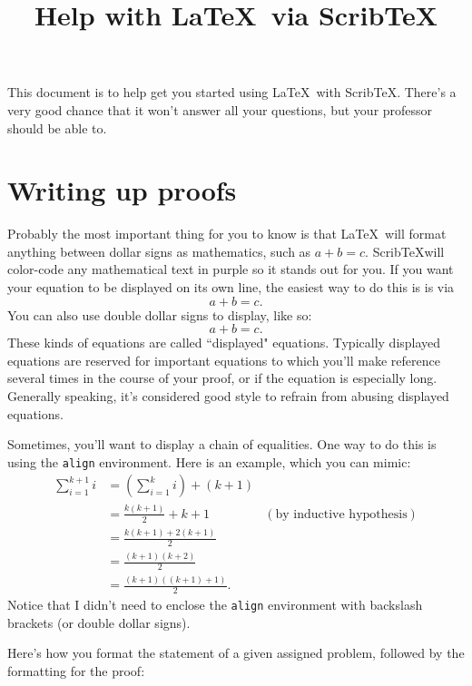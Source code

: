 \documentclass[12pt]{article}
\begin{document}

\title{Help with \LaTeX\ via Scrib\TeX}

\maketitle

This document is to help get you started using \LaTeX\ with Scrib\TeX.  There's a very good chance that it won't answer all your questions, but your professor should be able to.

\section{Writing up proofs}

Probably the most important thing for you to know is that \LaTeX\ will format anything between dollar signs as mathematics, such as $a+b=c$.  Scrib\TeX will color-code any mathematical text in purple so it stands out for you.  If you want your equation to be displayed on its own line, the easiest way to do this is is via
\[
a+b=c.
\]
You can also use double dollar signs to display, like so:
$$a+b=c.$$
These kinds of equations are called ``displayed" equations.  Typically displayed equations are reserved for important equations to which you'll make reference several times in the course of your proof, or if the equation is especially long.  Generally speaking, it's considered good style to refrain from abusing displayed equations.

Sometimes, you'll want to display a chain of equalities.  One way to do this is using the \texttt{align} environment.  Here is an example, which you can mimic:
\begin{align*}
\sum_{i=1}^{k+1}i & = \left(\sum_{i=1}^{k}i\right) +(k+1)\\ 
& = \frac{k(k+1)}{2}+k+1 & (\text{by inductive hypothesis})\\
& = \frac{k(k+1)+2(k+1)}{2}\\
& = \frac{(k+1)(k+2)}{2}\\
& = \frac{(k+1)((k+1)+1)}{2}.
\end{align*}
Notice that I didn't need to enclose the \texttt{align} environment with backslash brackets (or double dollar signs).

Here's how you format the statement of a given assigned problem, followed by the formatting for the proof:
\end{document}
